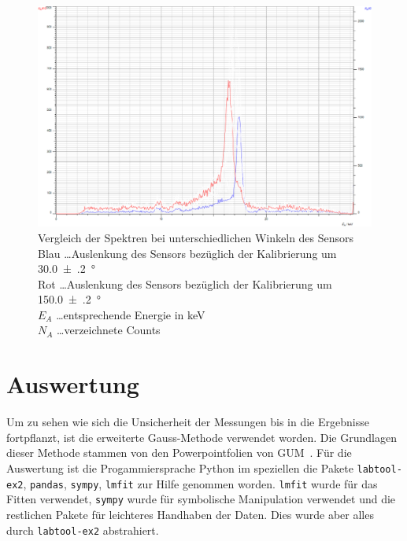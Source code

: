 \documentclass[12pt,english,ngerman]{scrartcl}
\begin{document}
\begin{figure}[H]
	\begin{center}
		\includegraphics[width =\textwidth]{./figures/compton/vergleich.png}
	\end{center}
	\caption[Aufgezeichnetes Kalibrierungsspektrum mit Interface] {\footnotesize Vergleich
		der Spektren bei unterschiedlichen Winkeln des Sensors \\
		Blau \dots Auslenkung des Sensors bezüglich der Kalibrierung um
		\SI{30.0(2)}{\degree}                                  \\
		Rot \dots Auslenkung des Sensors bezüglich der Kalibrierung um
		\SI{150.0(2)}{\degree}                                 \\
		$E_A$ \dots entsprechende Energie in keV               \\
		$N_A$ \dots verzeichnete Counts
	}\label{fig:verschiebung_compton}
\end{figure}

\section{Auswertung}\label{sec:auswertung}

Um zu sehen wie sich die Unsicherheit der Messungen bis in die Ergebnisse
fortpflanzt, ist die erweiterte Gauss-Methode verwendet worden. Die Grundlagen
dieser Methode stammen von den Powerpointfolien von
GUM~\cite{wolfgang_kessel_isobipm-gum_2004}. Für die Auswertung ist die
Progammiersprache Python im speziellen die Pakete \verb#labtool-ex2#,
\verb#pandas#, \verb#sympy#, \verb#lmfit# zur Hilfe genommen worden.
\verb#lmfit# wurde für das Fitten verwendet, \verb#sympy# wurde für symbolische
Manipulation verwendet und die restlichen Pakete für leichteres Handhaben der
Daten. Dies wurde aber alles durch \verb#labtool-ex2# abstrahiert.
\end{document}
